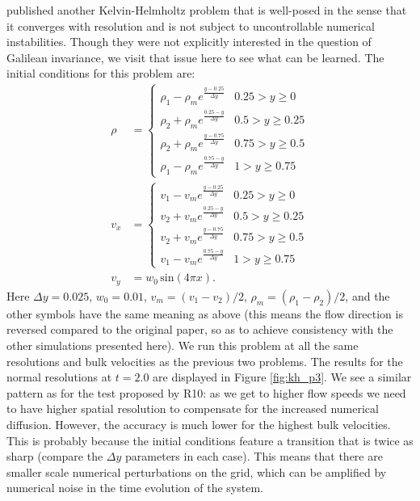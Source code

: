 \documentclass[iop]{emulateapj}
\begin{document}
\citet{mcnally:2012} published another Kelvin-Helmholtz problem that 
is well-posed in the sense that it converges with resolution and 
is not subject to uncontrollable numerical instabilities. Though they 
were not explicitly interested in the question of Galilean invariance, 
we visit that issue here to see what can be learned. The initial 
conditions for this problem are:
\begin{align}
  \rho &= \begin{cases} \rho_1 - \rho_m e^{\frac{y-0.25}{\Delta y}} & 0.25 > y \geq 0 \\ 
                        \rho_2 + \rho_m e^{\frac{0.25-y}{\Delta y}} & 0.5 > y \geq 0.25 \\
                        \rho_2 + \rho_m e^{\frac{y-0.75}{\Delta y}} & 0.75 > y \geq 0.5 \\
                        \rho_1 - \rho_m e^{\frac{0.75-y}{\Delta y}} & 1 > y \geq 0.75 \end{cases} \label{eq:kh_p3_rho}\\
  v_x &= \begin{cases} v_1 - v_m e^{\frac{y-0.25}{\Delta y}} & 0.25 > y \geq 0 \\
                       v_2 + v_m e^{\frac{0.25-y}{\Delta y}} & 0.5 > y \geq 0.25 \\
                       v_2 + v_m e^{\frac{y-0.75}{\Delta y}} & 0.75 > y \geq 0.5 \\
                       v_1 - v_m e^{\frac{0.75-y}{\Delta y}} & 1 > y \geq 0.75 \end{cases} \label{eq:kh_p3_vx} \\
  v_y &= w_0\, \text{sin}\left(4\pi x\right). \label{eq:kh_p3_vy}
\end{align}
Here $\Delta y = 0.025$, $w_0 = 0.01$, $v_m = (v_1 - v_2) / 2$, $\rho_m = (\rho_1 - \rho_2) / 2$, 
and the other symbols have the same meaning as above (this means the flow direction
is reversed compared to the original paper, so as to achieve consistency with the 
other simulations presented here). We run this problem at all the same resolutions 
and bulk velocities as the previous two problems. The results for the normal resolutions 
at $t = 2.0$ are displayed in Figure \ref{fig:kh_p3}. We see a similar pattern as for 
the test proposed by R10: as we get to higher flow speeds we need to have higher 
spatial resolution to compensate for the increased numerical diffusion. However, 
the accuracy is much lower for the highest bulk velocities. This is probably because 
the initial conditions feature a transition that is twice as sharp (compare the $\Delta y$ 
parameters in each case). This means that there are smaller scale numerical 
perturbations on the grid, which can be amplified by numerical noise in the time 
evolution of the system.
\end{document}
